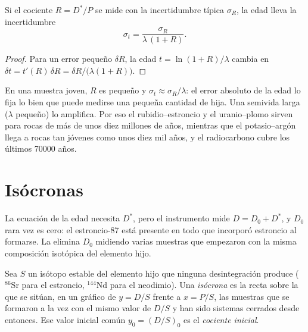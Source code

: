 \begin{proposition}\label{prop:b1:radiometric-methods:precision}
Si el cociente $R = D^*/P$ se mide con la incertidumbre típica $\sigma_R$,
la edad lleva la incertidumbre
\[
  \sigma_t = \frac{\sigma_R}{\lambda\,(1 + R)}.
\]
\end{proposition}

\begin{proof}
Para un error pequeño $\delta R$, la edad $t = \ln(1+R)/\lambda$ cambia en
$\delta t = t'(R)\,\delta R = \delta R/\bigl(\lambda(1 + R)\bigr)$.
\end{proof}

En una muestra joven, $R$ es pequeño y $\sigma_t \approx \sigma_R/\lambda$: el error absoluto de la edad lo fija lo bien que puede medirse una pequeña cantidad de hija.
Una semivida larga ($\lambda$ pequeño) lo amplifica. Por eso el rubidio--estroncio y el uranio--plomo sirven para rocas de más de unos diez millones de años, mientras que el potasio--argón llega a rocas tan jóvenes como unos diez mil años, y el radiocarbono cubre los últimos \num{70000} años.

\section{Isócronas}\label{sec:b1:radiometric-methods:isochrons}

La ecuación de la edad necesita $D^*$, pero el instrumento mide $D = D_0 + D^*$, y
$D_0$ rara vez es cero: el estroncio-87 está presente en todo  que incorporó estroncio al formarse. La  elimina $D_0$ midiendo varias
muestras que empezaron con la misma composición isotópica del elemento hijo.

\begin{definition}\label{def:b1:radiometric-methods:isochron}
Sea $S$ un isótopo estable del elemento hijo que ninguna desintegración produce
($^{86}\mathrm{Sr}$ para el estroncio, $^{144}\mathrm{Nd}$ para el neodimio). Una
\emph{isócrona} es la recta sobre la que se sitúan, en un gráfico de $y = D/S$ frente a $x = P/S$, las muestras que se formaron a la vez con el mismo valor de $D/S$ y han sido sistemas cerrados desde entonces. Ese valor inicial común
$y_0 = (D/S)_0$ es el \emph{cociente inicial}.
\end{definition}


